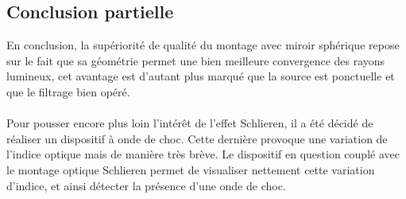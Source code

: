 \subsection{Conclusion partielle}
En conclusion, la supériorité de qualité du montage avec miroir sphérique repose sur le fait que sa géométrie permet une bien meilleure convergence des rayons lumineux, cet avantage est d’autant plus marqué que la source est ponctuelle et que le filtrage bien opéré.
\\\\
Pour pousser encore plus loin l'intérêt de l’effet Schlieren, il a été décidé de réaliser un dispositif à onde de choc. Cette dernière provoque une variation de l’indice optique mais de manière très brève. Le dispositif en question couplé avec le montage optique Schlieren permet de visualiser nettement cette variation d’indice, et ainsi détecter la présence d’une onde de choc.  